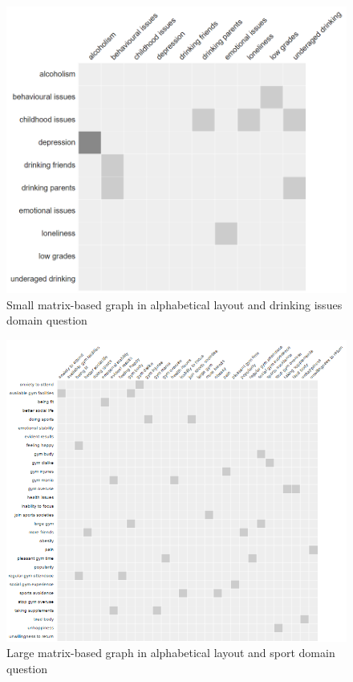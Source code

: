 \documentclass{l4proj}
\begin{document}
\begin{appendices}
\begin{figure}[H]
\centering
\includegraphics[width=16cm]{images/drinkingSmallAlpha.PNG}
\caption{Small matrix-based graph in alphabetical layout and drinking issues domain question}
\label{drinkingSmallAlpha}
\end{figure}

\begin{figure}[H]
\centering
\includegraphics[width=16cm]{images/gymLargeAlpha.PNG}
\caption{Large matrix-based graph in alphabetical layout and sport domain question}
\label{gymLargeAlpha}
\end{figure}



\end{appendices}
\end{document}
